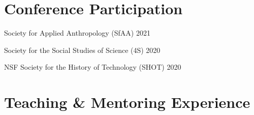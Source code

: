 \documentclass[11pt,letterpaper]{report}
\newcommand{\listitemspace}{0.25em}
\renewenvironment{itemize}{\begin{list}{}{\setlength{\leftmargin}{0em}\setlength{\parskip}{0em}\setlength{\itemsep}{\listitemspace}\setlength{\parsep}{\listitemspace}}}{\end{list}}
\begin{document}
    \section*{Conference Participation}
    \begin{itemize}
        \item Society for Applied Anthropology (SfAA) 2021
        \item Society for the Social Studies of Science (4S) 2020
        \item NSF Society for the History of Technology (SHOT) 2020
    \end{itemize}

    \section*{Teaching \& Mentoring Experience}
\end{document}
